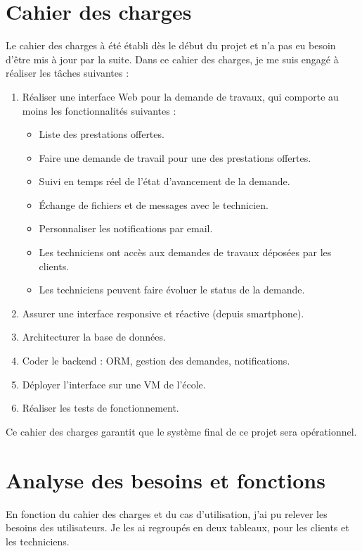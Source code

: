 \documentclass[
    iai, %
    eai, %
]{heig-tb}
\begin{document}
\newpage
\section{Cahier des charges}
Le cahier des charges à été établi dès le début du projet et n'a pas eu besoin d'être mis à jour par la suite.
Dans ce cahier des charges, je me suis engagé à réaliser les tâches suivantes :

\begin{enumerate}
  \item Réaliser une interface Web pour la demande de travaux, qui comporte au moins les fonctionnalités suivantes :
        \begin{itemize}
          \item Liste des prestations offertes.
          \item Faire une demande de travail pour une des prestations offertes.
          \item Suivi en temps réel de l'état d'avancement de la demande.
          \item Échange de fichiers et de messages avec le technicien.
          \item Personnaliser les notifications par email.
          \item Les techniciens ont accès aux demandes de travaux déposées par les clients.
          \item Les techniciens peuvent faire évoluer le status de la demande.
        \end{itemize}
  \item Assurer une interface responsive et réactive (depuis smartphone).
  \item Architecturer la base de données.
  \item Coder le backend : ORM, gestion des demandes, notifications.
  \item Déployer l'interface sur une VM de l'école.
  \item Réaliser les tests de fonctionnement.
\end{enumerate}
\bigskip
Ce cahier des charges garantit que le système final de ce projet sera opérationnel.

\newpage
\section{Analyse des besoins et fonctions}
En fonction du cahier des charges et du cas d'utilisation, j'ai pu relever les besoins des utilisateurs.
Je les ai regroupés en deux tableaux, pour les clients et les techniciens.
\end{document}
